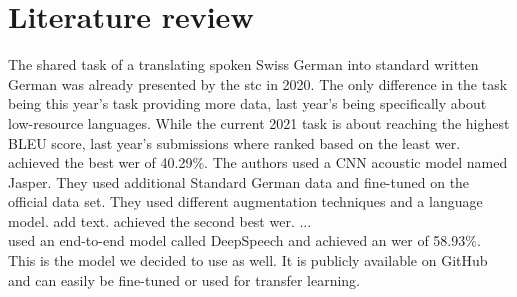\section{Literature review}
The shared task of a translating spoken Swiss German into standard written German was already presented by the \gls{stc} in 2020. The only difference in the task being this year's task providing more data, last year's being specifically about low-resource languages. While the current 2021 task is about reaching the highest BLEU score, last year's submissions where ranked based on the least \gls{wer}. \citet{buechi2020} achieved the best \gls{wer} of 40.29\%. The authors used a CNN acoustic model named Jasper. They used additional Standard German data and fine-tuned on the official data set. They used different augmentation techniques and a language model. \citet{pluss2020} add text. \cite{Kew2020} achieved the second best \gls{wer}. ... \\
\citet{agarwal2020} used an end-to-end model called DeepSpeech and achieved an \gls{wer} of 58.93\%. This is the model we decided to use as well. It is publicly available on GitHub and can easily be fine-tuned or used for transfer learning. 
